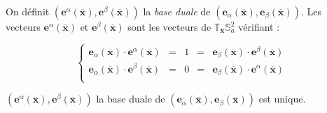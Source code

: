 \begin{definition}
On définit $(\mathbf{e}^{\alpha}(\overline{\mathbf{x}}), \mathbf{e}^{\beta}(\overline{\mathbf{x}}))$ la \textit{base duale} de $(\mathbf{e}_{\alpha}(\overline{\mathbf{x}}), \mathbf{e}_{\beta}(\overline{\mathbf{x}}))$.
Les vecteurs $\mathbf{e}^{\alpha}(\overline{\mathbf{x}})$ et $\mathbf{e}^{\beta}(\overline{\mathbf{x}})$ sont les vecteurs de $\mathbb{T}_{\overline{\mathbf{x}}}\mathbb{S}_a^2$ vérifiant :

\begin{equation}
\left\lbrace
\begin{array}{rcccl}
\mathbf{e}_{\alpha}(\overline{\mathbf{x}}) \cdot \mathbf{e}^{\alpha}(\overline{\mathbf{x}}) & = & 1 & = & \mathbf{e}_{\beta}(\overline{\mathbf{x}}) \cdot \mathbf{e}^{\beta}(\overline{\mathbf{x}}) \\
\mathbf{e}_{\alpha}(\overline{\mathbf{x}}) \cdot \mathbf{e}^{\beta}(\overline{\mathbf{x}}) & = & 0 & = & \mathbf{e}_{\beta}(\overline{\mathbf{x}}) \cdot \mathbf{e}^{\alpha}(\overline{\mathbf{x}}) \\
\end{array}
\right.
\label{eq: dualite alpha beta}
\end{equation}

\end{definition}

\begin{proposition}
$(\mathbf{e}^{\alpha}(\overline{\mathbf{x}}), \mathbf{e}^{\beta}(\overline{\mathbf{x}}))$ la base duale de $(\mathbf{e}_{\alpha}(\overline{\mathbf{x}}), \mathbf{e}_{\beta}(\overline{\mathbf{x}}))$ est unique.
\end{proposition}

